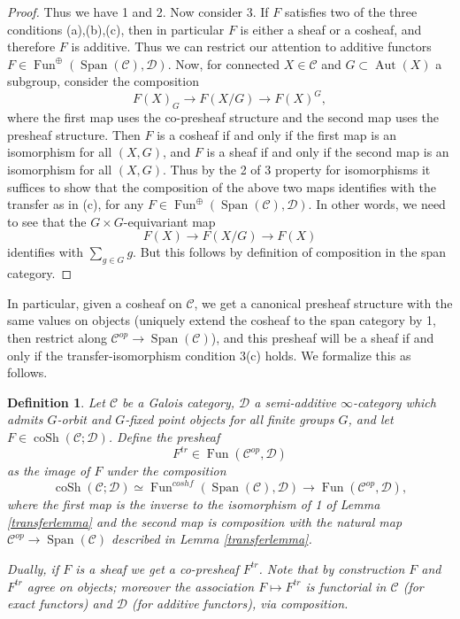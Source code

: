 \documentclass[12pt]{article}
\newtheorem{definition}[theorem]{Definition}
\theoremstyle{definition}
\newcommand{\on}{\operatorname}
\newcommand{\mc}{\mathcal}
\begin{document}
\begin{proof}
Thus we have 1 and 2.  Now consider 3.  If $F$ satisfies two of the three conditions (a),(b),(c), then in particular $F$ is either a sheaf or a cosheaf, and therefore $F$ is additive.  Thus we can restrict our attention to additive functors $F\in\on{Fun}^{\oplus}(\on{Span}(\mc{C}),\mc{D})$.  Now, for connected $X\in\mc{C}$ and $G\subset \on{Aut}(X)$ a subgroup, consider the composition
$$F(X)_G \to F(X/G) \to F(X)^G,$$
where the first map uses the co-presheaf structure and the second map uses the presheaf structure.  Then $F$ is a cosheaf if and only if the first map is an isomorphism for all $(X,G)$, and $F$ is a sheaf if and only if the second map is an isomorphism for all $(X,G)$.  Thus by the 2 of 3 property for isomorphisms it suffices to show that the composition of the above two maps identifies with the transfer as in (c), for any $F\in \on{Fun}^{\oplus}(\on{Span}(\mc{C}),\mc{D})$.  In other words, we need to see that the $G\times G$-equivariant map
$$F(X) \to F(X/G) \to F(X)$$
identifies with $\sum_{g\in G} g$.  But this follows by definition of composition in the span category.
\end{proof}

In particular, given a cosheaf on $\mc{C}$, we get a canonical presheaf structure with the same values on objects (uniquely extend the cosheaf to the span category by 1, then restrict along $\mc{C}^{op}\to\on{Span}(\mc{C})$), and this presheaf will be a sheaf if and only if the transfer-isomorphism condition 3(c) holds.  We formalize this as follows.

\begin{definition}\label{trfunctor}
Let $\mc{C}$ be a Galois category, $\mc{D}$ a semi-additive $\infty$-category which admits $G$-orbit and $G$-fixed point objects for all finite groups $G$, and let $F\in \on{coSh}(\mc{C};\mc{D})$.  Define the presheaf
$$F^{tr} \in \on{Fun}(\mc{C}^{op},\mc{D})$$
as the image of $F$ under the composition
$$\on{coSh}(\mc{C};\mc{D})\simeq\on{Fun}^{coshf}(\on{Span}(\mc{C}),\mc{D})\rightarrow \on{Fun}(\mc{C}^{op},\mc{D}),$$
where the first map is the inverse to the isomorphism of 1 of Lemma \ref{transferlemma} and the second map is composition with the natural map $\mc{C}^{op}\to\on{Span}(\mc{C})$ described in Lemma \ref{transferlemma}.

Dually, if $F$ is a sheaf we get a co-presheaf $F^{tr}$.  Note that by construction $F$ and $F^{tr}$ agree on objects; moreover the association $F\mapsto F^{tr}$ is functorial in $\mc{C}$ (for exact functors) and $\mc{D}$ (for additive functors), via composition.
\end{definition}
\end{document}
